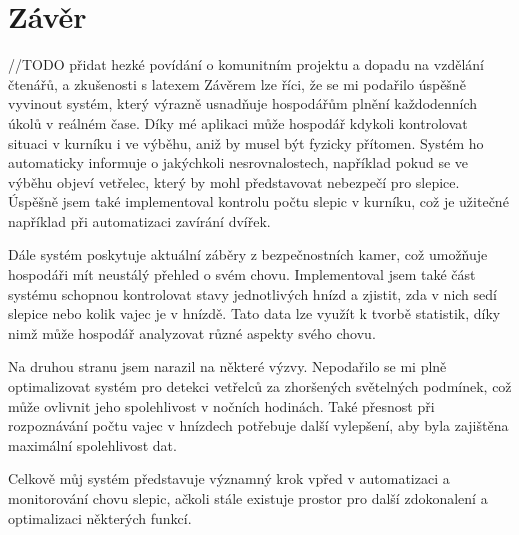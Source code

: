 ﻿\setlength{\parindent}{0pt}

\newpage
\chapter{Závěr}\label{ch:zaver}
//TODO přidat hezké povídání o komunitním projektu a dopadu na vzdělání čtenářů, a zkušenosti s latexem\newline
Závěrem lze říci, že se mi podařilo úspěšně vyvinout systém, který výrazně usnadňuje hospodářům plnění každodenních úkolů v reálném čase.
Díky mé aplikaci může hospodář kdykoli kontrolovat situaci v kurníku i ve výběhu, aniž by musel být fyzicky přítomen.
Systém ho automaticky informuje o jakýchkoli nesrovnalostech, například pokud se ve výběhu objeví vetřelec, který by mohl představovat nebezpečí pro slepice.
Úspěšně jsem také implementoval kontrolu počtu slepic v kurníku, což je užitečné například při automatizaci zavírání dvířek.

Dále systém poskytuje aktuální záběry z bezpečnostních kamer, což umožňuje hospodáři mít neustálý přehled o svém chovu.
Implementoval jsem také část systému schopnou kontrolovat stavy jednotlivých hnízd a zjistit, zda v nich sedí slepice nebo kolik vajec je v hnízdě.
Tato data lze využít k tvorbě statistik, díky nimž může hospodář analyzovat různé aspekty svého chovu.

Na druhou stranu jsem narazil na některé výzvy.
Nepodařilo se mi plně optimalizovat systém pro detekci vetřelců za zhoršených světelných podmínek, což může ovlivnit jeho spolehlivost v nočních hodinách.
Také přesnost při rozpoznávání počtu vajec v hnízdech potřebuje další vylepšení, aby byla zajištěna maximální spolehlivost dat.

Celkově můj systém představuje významný krok vpřed v automatizaci a monitorování chovu slepic, ačkoli stále existuje prostor pro další zdokonalení a optimalizaci některých funkcí.






